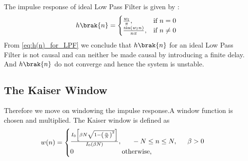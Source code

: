\documentclass{article}
\begin{document}
The impulse response of ideal Low Pass Filter is given by :
\begin{align}
    h\brak{n} = 
    \begin{cases} 
        \frac{w_l}{\pi},          & \text{if } n = 0    \\
        \frac{\sin(w_l n)}{n\pi}, & \text{if } n \neq 0
    \end{cases} \label{eq:h(n)_for_LPF}
\end{align}
From \eqref{eq:h(n)_for_LPF} we conclude that $h\brak{n}$ for an ideal Low Pass Filter is not causal and can neither be made causal by introducing a finite delay. And $h\brak{n}$ do not converge and hence the system is unstable.
\subsection{The Kaiser Window}
Therefore we move on windowing the impulse response.A window function is chosen and multiplied. The Kaiser window is defined as
\begin{align}
    w(n) =
    \begin{cases}
        \frac{I_0\left[ \beta N \sqrt{1 - \left(\frac{n}{N}\right)^2} \right]}{I_0(\beta N)},
        \indent -N \leq n \leq N, \indent \beta > 0 \nonumber \\
        0 \hspace{2.5 cm} \mbox{otherwise,}
    \end{cases}
\end{align}
\end{document}
